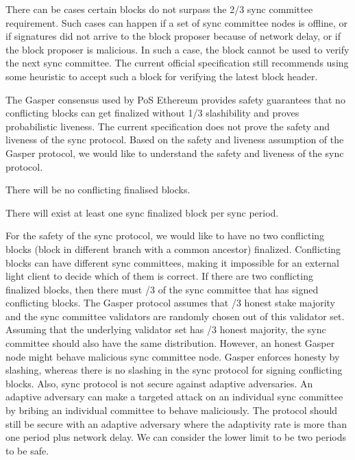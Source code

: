 There can be cases certain blocks do not surpass the 2/3 sync committee requirement. 
Such cases can happen if a set of sync committee nodes is offline, or if signatures did not arrive to the block proposer because of network delay, or if the block proposer is malicious. 
In such a case, the block cannot be used to verify the next sync committee. 
The current official specification still recommends using some heuristic to accept such a block for verifying the latest block header.  
  
The Gasper consensus used by PoS Ethereum provides safety guarantees that no conflicting blocks can get finalized without 1/3 slashibility and proves probabilistic liveness. 
The current specification does not prove the safety and liveness of the sync protocol. 
Based on the safety and liveness assumption of the Gasper protocol, we would like to understand the safety and liveness of the sync protocol.  

\begin{definition}
There will be no conflicting finalised blocks.  
\end{definition}
  
\begin{definition}
There will exist at least one sync finalized block per sync period.  
\end{definition}
  
For the safety of the sync protocol, we would like to have no two conflicting blocks (block in different branch with a common ancestor) finalized. 
Conflicting blocks can have different sync committees, making it impossible for an external light client to decide which of them is correct. 
If there are two conflicting finalized blocks, then there must /3 of the sync committee that has signed conflicting blocks. 
The Gasper protocol assumes that /3 honest stake majority and the sync committee validators are randomly chosen out of this validator set. 
Assuming that the underlying validator set has /3 honest majority, the sync committee should also have the same distribution. 
However, an honest Gasper node might behave malicious sync committee node. 
Gasper enforces honesty by slashing, whereas there is no slashing in the sync protocol for signing conflicting blocks. 
Also, sync protocol is not secure against adaptive adversaries. An adaptive adversary can make a targeted attack on an individual sync committee by bribing an individual committee to behave maliciously. 
The protocol should still be secure with an adaptive adversary where the adaptivity rate is more than one period plus network delay. 
We can consider the lower limit to be two periods to be safe. 
 
